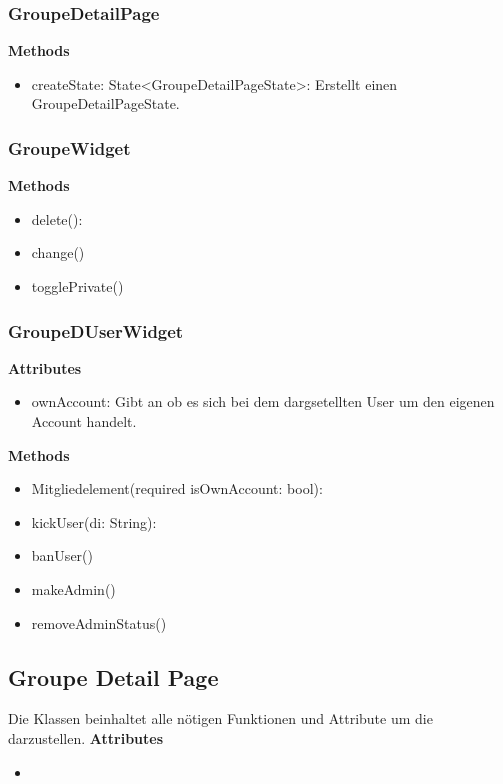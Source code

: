 \documentclass[parskip=full]{scrartcl}
\begin{document}
        \subsubsection{GroupeDetailPage}
            \textbf{Methods}
            \begin{itemize}
                \item createState: State<GroupeDetailPageState>: Erstellt einen GroupeDetailPageState.
            \end{itemize}

        \subsubsection{GroupeWidget}
            \textbf{Methods}
            \begin{itemize}
                \item delete(): 
                \item change()
                \item togglePrivate()
            \end{itemize}

        \subsubsection{GroupeDUserWidget}
            \textbf{Attributes}
            \begin{itemize}
                \item ownAccount: Gibt an ob es sich bei dem dargsetellten User um den eigenen Account handelt.
            \end{itemize}
            
            \textbf{Methods}
            \begin{itemize}
                \item  Mitgliedelement(required isOwnAccount: bool):
                \item  kickUser(di: String):
                \item  banUser()
                \item  makeAdmin()
                \item  removeAdminStatus()
            \end{itemize}
    
        \newpage
        
         \subsection{Groupe Detail Page}
            Die Klassen beinhaltet alle nötigen Funktionen und Attribute um die  darzustellen.\newline
        \textbf{Attributes}
        \begin{itemize}
            \item 
        \end{itemize}
        
\end{document}

